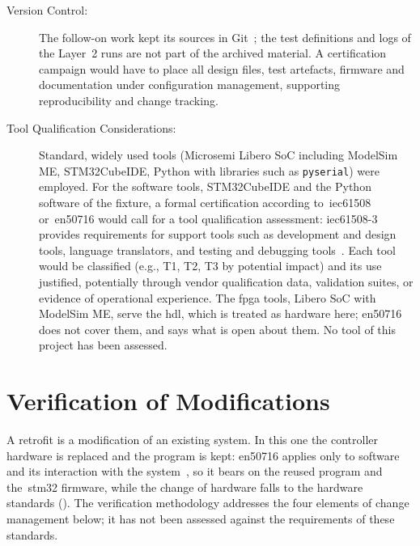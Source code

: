 \begin{description}
	\item[Version Control:] The follow-on work kept its sources in Git~\cite[p.~7]{savchuk2025}; the test definitions and logs of the Layer~2 runs are not part of the archived material. A certification campaign would have to place all design files, test artefacts, firmware and documentation under configuration management, supporting reproducibility and change tracking.
	\item[Tool Qualification Considerations:] Standard, widely used tools (Microsemi Libero SoC including ModelSim ME, STM32CubeIDE, Python with libraries such as \texttt{pyserial}) were employed. For the software tools, STM32CubeIDE and the Python software of the fixture, a formal certification according to~\gls{iec61508} or~\gls{en50716} would call for a tool qualification assessment: \mbox{\gls{iec61508}-3} provides requirements for support tools such as development and design tools, language translators, and testing and debugging tools~\cite{iec61508_3_2010}. Each tool would be classified (e.g., T1, T2, T3 by potential impact) and its use justified, potentially through vendor qualification data, validation suites, or evidence of operational experience. The \gls{fpga} tools, Libero SoC with ModelSim ME, serve the \gls{hdl}, which is treated as hardware here; \gls{en50716} does not cover them, and  says what is open about them. No tool of this project has been assessed.
\end{description}

\section{Verification of Modifications}
\label{sec:en50716_modifications}

A retrofit is a modification of an existing system. In this one the controller hardware is replaced and the program is kept: \gls{en50716} applies only to software and its interaction with the system~\cite{en50716_2023}, so it bears on the reused program and the~\gls{stm32} firmware, while the change of hardware falls to the hardware standards (). The verification methodology addresses the four elements of change management below; it has not been assessed against the requirements of these standards.


